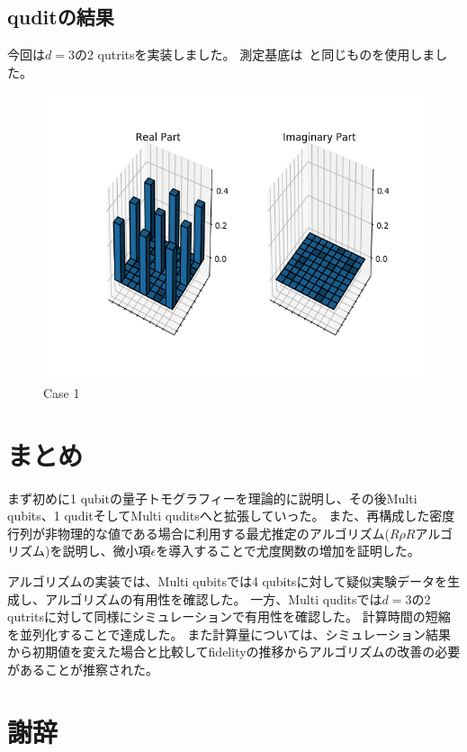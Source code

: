 \documentclass[11pt,a4j,notitlepage]{jreport}
\begin{document}
	\section{quditの結果}

	今回は$d=3$の2 qutritsを実装しました。
	測定基底は~\cite{qutrit}と同じものを使用しました。

	\begin{figure}[htbp]
		\centering
			\includegraphics[clip,width=12.0cm]{./picture/qutrit.png}
			\caption{Case 1}
	\end{figure}

	\chapter{まとめ}

	まず初めに1 qubitの量子トモグラフィーを理論的に説明し、その後Multi qubits、1 quditそしてMulti quditsへと拡張していった。
	また、再構成した密度行列が非物理的な値である場合に利用する最尤推定のアルゴリズム($R \rho R$アルゴリズム)を説明し、微小項$\epsilon$を導入することで尤度関数の増加を証明した。

	アルゴリズムの実装では、Multi qubitsでは4 qubitsに対して疑似実験データを生成し、アルゴリズムの有用性を確認した。
	一方、Multi quditsでは$d=3$の2 qutritsに対して同様にシミュレーションで有用性を確認した。
	計算時間の短縮を並列化することで達成した。
	また計算量については、シミュレーション結果から初期値を変えた場合と比較してfidelityの推移からアルゴリズムの改善の必要があることが推察された。


	\chapter*{謝辞}
\end{document}
